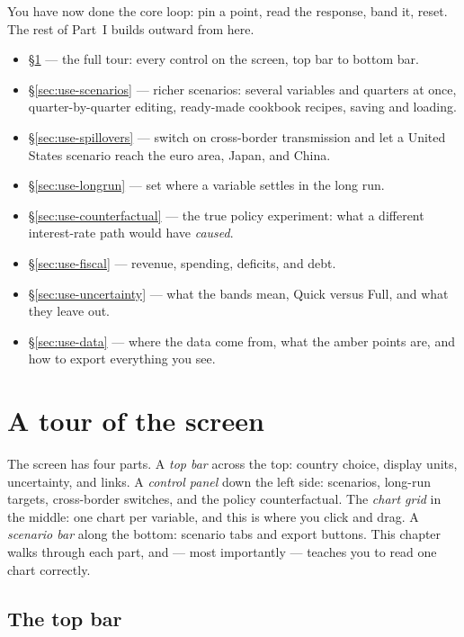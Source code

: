 \documentclass[11pt]{article}
\theoremstyle{definition}
\theoremstyle{remark}
\begin{document}
You have now done the core loop: pin a point, read the response, band it, reset.
The rest of Part~I builds outward from here.
\begin{itemize}
  \item \S\ref{sec:use-tour} --- the full tour: every control on the screen, top
    bar to bottom bar.
  \item \S\ref{sec:use-scenarios} --- richer scenarios: several variables and
    quarters at once, quarter-by-quarter editing, ready-made cookbook recipes,
    saving and loading.
  \item \S\ref{sec:use-spillovers} --- switch on cross-border transmission and let
    a United States scenario reach the euro area, Japan, and China.
  \item \S\ref{sec:use-longrun} --- set where a variable settles in the long run.
  \item \S\ref{sec:use-counterfactual} --- the true policy experiment: what a
    different interest-rate path would have \emph{caused}.
  \item \S\ref{sec:use-fiscal} --- revenue, spending, deficits, and debt.
  \item \S\ref{sec:use-uncertainty} --- what the bands mean, Quick versus Full,
    and what they leave out.
  \item \S\ref{sec:use-data} --- where the data come from, what the amber points
    are, and how to export everything you see.
\end{itemize}

\section{A tour of the screen}\label{sec:use-tour}\label{sec:interface}

The screen has four parts. A \emph{top bar} across the top: country choice, display units,
uncertainty, and links. A \emph{control panel} down the left side: scenarios, long-run targets,
cross-border switches, and the policy counterfactual. The \emph{chart grid} in the middle: one
chart per variable, and this is where you click and drag. A \emph{scenario bar} along the bottom:
scenario tabs and export buttons. This chapter walks through each part, and --- most importantly
--- teaches you to read one chart correctly.

\subsection{The top bar}
\end{document}

